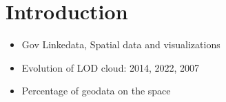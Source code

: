 \chapter{Introduction}
\label{intro}

\begin{itemize}
\item Gov Linkedata, Spatial data and visualizations
\item Evolution of LOD cloud: 2014, 2022, 2007
\item Percentage of geodata on the space
\end{itemize}
